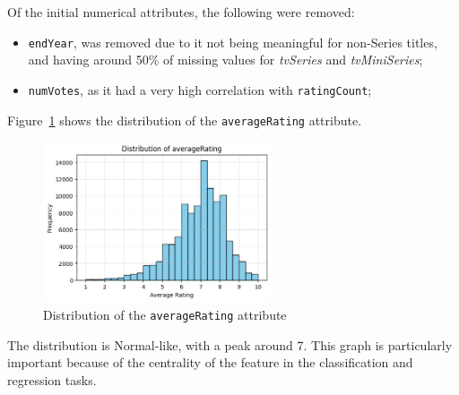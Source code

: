 Of the initial numerical attributes, the following were removed:
\begin{itemize}
    \item \texttt{endYear}, was removed due to it not being meaningful for
non-Series titles, and having around 50\% of missing values for \textit{tvSeries} and
\textit{tvMiniSeries};
    \item \texttt{numVotes}, as it had a very high correlation with \texttt{ratingCount};
\end{itemize}


Figure~\ref{fig:rating_dist} shows the distribution of the
\texttt{averageRating} attribute.
\begin{figure}[H]
    \centering
    \includegraphics[width=0.6\textwidth]{plotsss/rating_distrib.png}
    \caption{Distribution of the \texttt{averageRating} attribute}
    \label{fig:rating_dist}
\end{figure}
The distribution is Normal-like, with a peak around 7.
This graph is particularly important because of the centrality
of the feature in the classification and regression tasks.

